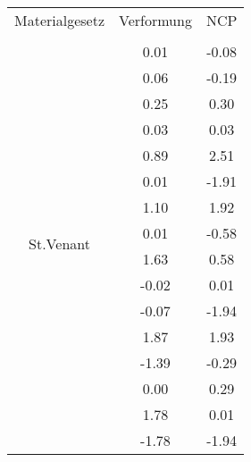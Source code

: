 \begin{table} 
\centering 
\begin{tabular}{c|cc|} 
\cline{2-3} 
 &  \\ 
\hline 
\multicolumn{1}{|c|}{Materialgesetz} & \multicolumn{1}{c|}{Verformung} & \multicolumn{1}{c|}{NCP} \\ 
\hline 
\multicolumn{1}{|c|}{\multirow{101}{*}{St.Venant}} &\multicolumn{1}{|c|}{} & \multicolumn{1}{|c|}{} \\ 
\multicolumn{1}{|c|}{} & \multicolumn{1}{|c|}{      0.01} & \multicolumn{1}{|c|}{     -0.08} \\ 
\multicolumn{1}{|c|}{} & \multicolumn{1}{|c|}{      0.06} & \multicolumn{1}{|c|}{     -0.19} \\ 
\multicolumn{1}{|c|}{} & \multicolumn{1}{|c|}{      0.25} & \multicolumn{1}{|c|}{      0.30} \\ 
\multicolumn{1}{|c|}{} & \multicolumn{1}{|c|}{      0.03} & \multicolumn{1}{|c|}{      0.03} \\ 
\multicolumn{1}{|c|}{} & \multicolumn{1}{|c|}{      0.89} & \multicolumn{1}{|c|}{      2.51} \\ 
\multicolumn{1}{|c|}{} & \multicolumn{1}{|c|}{      0.01} & \multicolumn{1}{|c|}{     -1.91} \\ 
\multicolumn{1}{|c|}{} & \multicolumn{1}{|c|}{      1.10} & \multicolumn{1}{|c|}{      1.92} \\ 
\multicolumn{1}{|c|}{} & \multicolumn{1}{|c|}{      0.01} & \multicolumn{1}{|c|}{     -0.58} \\ 
\multicolumn{1}{|c|}{} & \multicolumn{1}{|c|}{      1.63} & \multicolumn{1}{|c|}{      0.58} \\ 
\multicolumn{1}{|c|}{} & \multicolumn{1}{|c|}{     -0.02} & \multicolumn{1}{|c|}{      0.01} \\ 
\multicolumn{1}{|c|}{} & \multicolumn{1}{|c|}{     -0.07} & \multicolumn{1}{|c|}{     -1.94} \\ 
\multicolumn{1}{|c|}{} & \multicolumn{1}{|c|}{      1.87} & \multicolumn{1}{|c|}{      1.93} \\ 
\multicolumn{1}{|c|}{} & \multicolumn{1}{|c|}{     -1.39} & \multicolumn{1}{|c|}{     -0.29} \\ 
\multicolumn{1}{|c|}{} & \multicolumn{1}{|c|}{      0.00} & \multicolumn{1}{|c|}{      0.29} \\ 
\multicolumn{1}{|c|}{} & \multicolumn{1}{|c|}{      1.78} & \multicolumn{1}{|c|}{      0.01} \\ 
\multicolumn{1}{|c|}{} & \multicolumn{1}{|c|}{     -1.78} & \multicolumn{1}{|c|}{     -1.94} \\ 

\end{tabular}
\end{table}
